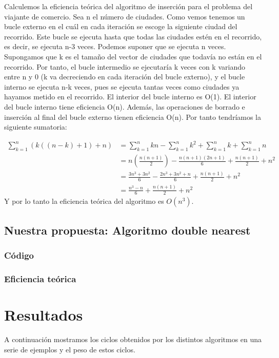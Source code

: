\documentclass[a4]{article}
\begin{document}
Calculemos la eficiencia teórica del algoritmo de inserción para el
problema del viajante de comercio. Sea n el número de ciudades. Como
vemos tenemos un bucle externo en el cuál en cada iteración se escoge
la siguiente ciudad del recorrido. Este bucle se ejecuta hasta que
todas las ciudades estén en el recorrido, es decir, se ejecuta n-3
veces. Podemos suponer que se ejecuta n veces. Supongamos que k es el
tamaño del vector de ciudades que todavía no están en el
recorrido. Por tanto, el bucle intermedio se ejecutaría k veces con k
variando entre n y 0 (k va decreciendo en cada iteración del bucle
externo), y el bucle interno se ejecuta n-k veces, pues se ejecuta
tantas veces como ciudades ya hayamos metido en el recorrido. El
interior del bucle interno es O(1). El interior del bucle interno
tiene eficiencia O(n). Además, las operaciones de borrado e inserción
al final del bucle externo tienen eficiencia O(n). Por tanto
tendríamos la siguiente sumatoria:

\begin{align*}
\sum_{k=1}^{n}(k((n-k)+1)+n)&=\sum_{k=1}^{n}kn-\sum_{k=1}^{n}k^2+\sum_{k=1}^{n}k+\sum_{k=1}^{n}n\\&=n(\frac{n(n+1)}{2})-\frac{n(n+1)(2n+1)}{6}+\frac{n(n+1)}{2}+n^2\\&=\frac{3n^3+3n^2}{6}-\frac{2n^3+3n^2+n}{6}+\frac{n(n+1)}{2}+n^2\\&=\frac{n^3-n}{6}+\frac{n(n+1)}{2}+n^2
\end{align*}
Y por lo tanto la eficiencia teórica del algoritmo es $O(n^3)$.

\subsection{Nuestra propuesta: Algoritmo double nearest}

\subsubsection{Código}

\subsubsection{Eficiencia teórica}

\section{Resultados}

A continuación mostramos los ciclos obtenidos por los distintos
algoritmos en una serie de ejemplos y el peso de estos ciclos.
\end{document}
